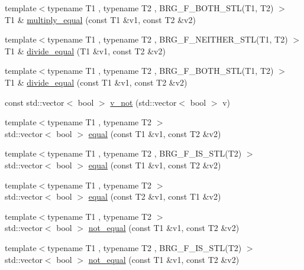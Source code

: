 \begin{DoxyCompactItemize}
\item 
{\footnotesize template$<$typename T1 , typename T2 , B\-R\-G\-\_\-\-F\-\_\-\-B\-O\-T\-H\-\_\-\-S\-T\-L(\-T1, T2) $>$ }\\T1 \& \hyperlink{namespaceIceBRG_aa66c71e85623b0be9cd03d3a295947f7}{multiply\-\_\-equal} (const T1 \&v1, const T2 \&v2)
\item 
{\footnotesize template$<$typename T1 , typename T2 , B\-R\-G\-\_\-\-F\-\_\-\-N\-E\-I\-T\-H\-E\-R\-\_\-\-S\-T\-L(\-T1, T2) $>$ }\\T1 \& \hyperlink{namespaceIceBRG_a5106c5eed809484b3622b6e07e31a660}{divide\-\_\-equal} (T1 \&v1, const T2 \&v2)
\item 
{\footnotesize template$<$typename T1 , typename T2 , B\-R\-G\-\_\-\-F\-\_\-\-B\-O\-T\-H\-\_\-\-S\-T\-L(\-T1, T2) $>$ }\\T1 \& \hyperlink{namespaceIceBRG_a9130da5983c859a212eea03b6c692b8b}{divide\-\_\-equal} (const T1 \&v1, const T2 \&v2)
\item 
const std\-::vector$<$ bool $>$ \hyperlink{namespaceIceBRG_a6b8e5b6feec061a24ee1e3855b3835a9}{v\-\_\-not} (std\-::vector$<$ bool $>$ v)
\item 
{\footnotesize template$<$typename T1 , typename T2 $>$ }\\std\-::vector$<$ bool $>$ \hyperlink{namespaceIceBRG_ac85bf4dc1998925b4bb559f533f7e9a4}{equal} (const T1 \&v1, const T2 \&v2)
\item 
{\footnotesize template$<$typename T1 , typename T2 , B\-R\-G\-\_\-\-F\-\_\-\-I\-S\-\_\-\-S\-T\-L(\-T2) $>$ }\\std\-::vector$<$ bool $>$ \hyperlink{namespaceIceBRG_a1ebec5772373de03ee0343f31cf87ca2}{equal} (const T1 \&v1, const T2 \&v2)
\item 
{\footnotesize template$<$typename T1 , typename T2 $>$ }\\std\-::vector$<$ bool $>$ \hyperlink{namespaceIceBRG_ad45410c31d75fe373de350af8cb4dae1}{equal} (const T2 \&v1, const T1 \&v2)
\item 
{\footnotesize template$<$typename T1 , typename T2 $>$ }\\std\-::vector$<$ bool $>$ \hyperlink{namespaceIceBRG_ad207b5d4fe8f8273639819f70a57037a}{not\-\_\-equal} (const T1 \&v1, const T2 \&v2)
\item 
{\footnotesize template$<$typename T1 , typename T2 , B\-R\-G\-\_\-\-F\-\_\-\-I\-S\-\_\-\-S\-T\-L(\-T2) $>$ }\\std\-::vector$<$ bool $>$ \hyperlink{namespaceIceBRG_ae2a472a378de04c88c60a122b81aec55}{not\-\_\-equal} (const T1 \&v1, const T2 \&v2)

\end{DoxyCompactItemize}
